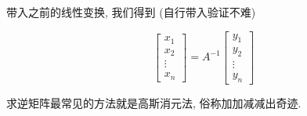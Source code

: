 \documentclass{ctexart}
\begin{document}
    带入之前的线性变换, 我们得到 (自行带入验证不难) 

    \begin{equation}
        \begin{bmatrix}
            x_1 \\
            x_2 \\
            \vdots \\
            x_n
        \end{bmatrix} = A^{-1} \begin {bmatrix}
            y_1 \\
            y_2 \\
            \vdots \\
            y_n
        \end{bmatrix}
    \end{equation}

    求逆矩阵最常见的方法就是高斯消元法, 俗称加加减减出奇迹.
\end{document}
